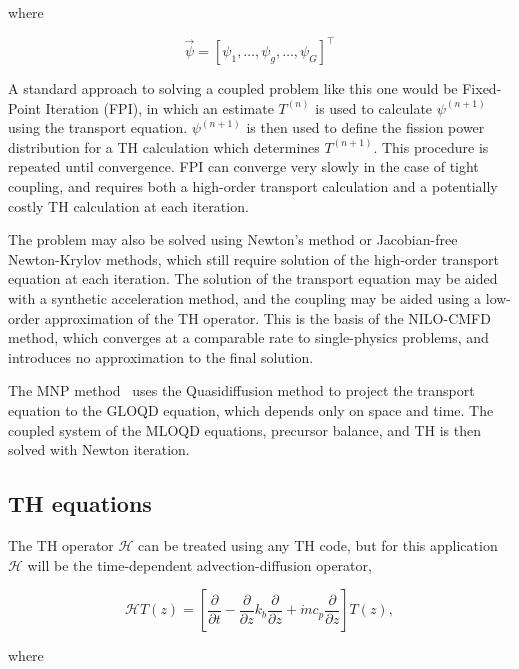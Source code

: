 \documentclass{proposal}
\newcommand{\calH}{\mathcal{H}}
\newcommand{\ddz}{\frac{\partial}{\partial z}}
\newcommand{\ddt}{\frac{\partial}{\partial t}}
\begin{document}
where 

\begin{equation}
    \vec{\psi} = \left[\psi_1, \dots, \psi_g, \dots, \psi_G \right]^\intercal
\end{equation}




A standard approach to solving a coupled problem like this one would be Fixed-Point Iteration (FPI), in which an estimate $T^{(n)}$ is used to calculate $\psi^{(n+1)}$ using the transport equation. $\psi^{(n+1)}$ is then used to define the fission power distribution for a TH calculation which determines $T^{(n+1)}$. This procedure is repeated until convergence. FPI can converge very slowly in the case of tight coupling, and requires both a high-order transport calculation and a potentially costly TH calculation at each iteration.

The problem may also be solved using Newton's method or Jacobian-free Newton-Krylov methods, which still require solution of the high-order transport equation at each iteration.
The solution of the transport equation may be aided with a synthetic acceleration method, and the coupling may be aided using a low-order approximation of the TH operator. This is the basis of the NILO-CMFD method, which converges at a comparable rate to single-physics problems, and introduces no approximation to the final solution.

The MNP method~\cite{tamang2014multilevel} uses the Quasidiffusion method to project the transport equation to the GLOQD equation, which depends only on space and time. The coupled system of the MLOQD equations, precursor balance, and TH is then solved with Newton iteration.








\subsection{TH equations}


The TH operator $\calH$ can be treated using any TH code, but for this application $\calH$ will be the time-dependent advection-diffusion operator,

\begin{equation}\label{eq:advection-diffusion}
    \calH T(z) = \left[ \ddt - \ddz k_b \ddz + \dot{m}c_p \ddz \right]T(z),
\end{equation}

where
\end{document}
